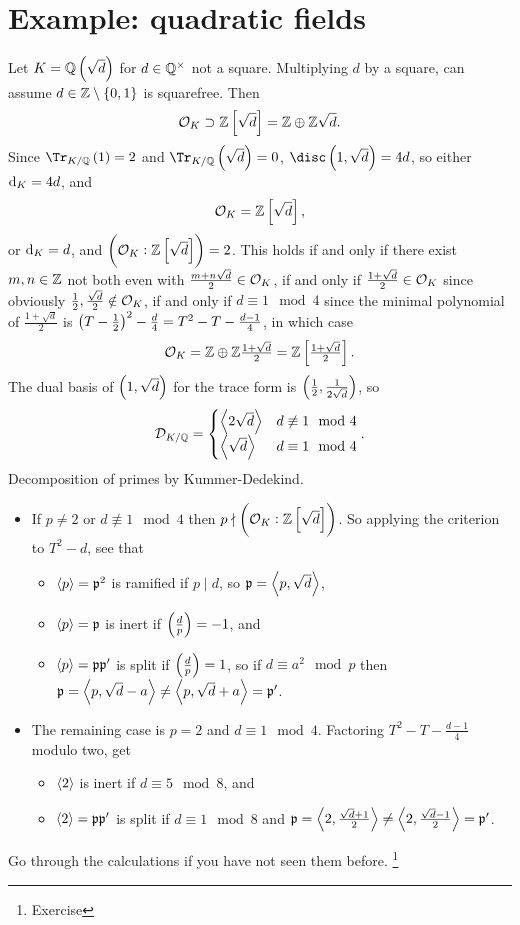 \pagebreak

\section{Example: quadratic fields}


Let $ K = \QQ\br{\sqrt{d}} $ for $ d \in \mathbb{Q}^\times $ not a square. Multiplying $ d $ by a square, can assume $ d \in \ZZ \setminus \cbr{0, 1} $ is squarefree. Then
$$ \OOO_K \supset \ZZ\sbr{\sqrt{d}} = \ZZ \oplus \ZZ\sqrt{d}. $$
Since $ \Tr_{K / \QQ}\br{1} = 2 $ and $ \Tr_{K / \QQ}\br{\sqrt{d}} = 0 $, $ \disc \br{1, \sqrt{d}} = 4d $, so either $ \mathrm{d}_K = 4d $, and
$$ \OOO_K = \ZZ\sbr{\sqrt{d}}, $$
or $ \mathrm{d}_K = d $, and $ \br{\OOO_K : \ZZ\sbr{\sqrt{d}}} = 2 $. This holds if and only if there exist $ m, n \in \mathbb{Z} $ not both even with $ \tfrac{m + n\sqrt{d}}{2} \in \mathcal{O}_K $, if and only if $ \tfrac{1 + \sqrt{d}}{2} \in \mathcal{O}_K $ since obviously $ \tfrac{1}{2}, \tfrac{\sqrt{d}}{2} \notin \mathcal{O}_K $, if and only if $ d \equiv 1 \mod 4 $ since the minimal polynomial of $ \tfrac{1 + \sqrt{d}}{2} $ is $ \br{T - \tfrac{1}{2}}^2 - \tfrac{d}{4} = T^2 - T - \tfrac{d - 1}{4} $, in which case
$$ \OOO_K = \ZZ \oplus \ZZ\tfrac{1 + \sqrt{d}}{2} = \ZZ\sbr{\tfrac{1 + \sqrt{d}}{2}}. $$
The dual basis of $ \br{1, \sqrt{d}} $ for the trace form is $ \br{\tfrac{1}{2}, \tfrac{1}{2\sqrt{d}}} $, so
$$ \mathcal{D}_{K / \mathbb{Q}} =
\begin{cases}
\left\langle 2\sqrt{d} \right\rangle & d \not\equiv 1 \mod 4 \\
\left\langle \sqrt{d} \right\rangle & d \equiv 1 \mod 4
\end{cases}.
$$
Decomposition of primes by Kummer-Dedekind.
\begin{itemize}
\item If $ p \ne 2 $ or $ d \not\equiv 1 \mod 4 $ then $ p \nmid \br{\OOO_K : \ZZ\sbr{\sqrt{d}}} $. So applying the criterion to $ T^2 - d $, see that
\begin{itemize}
\item $ \left\langle p \right\rangle = \mathfrak{p}^2 $ is ramified if $ p \mid d $, so $ \mathfrak{p} = \left\langle p, \sqrt{d} \right\rangle $,
\item $ \left\langle p \right\rangle = \mathfrak{p} $ is inert if $ \br{\tfrac{d}{p}} = -1 $, and
\item $ \left\langle p \right\rangle = \mathfrak{p}\mathfrak{p}' $ is split if $ \br{\tfrac{d}{p}} = 1 $, so if $ d \equiv a^2 \mod p $ then $ \mathfrak{p} = \left\langle p, \sqrt{d} - a \right\rangle \ne \left\langle p, \sqrt{d} + a \right\rangle = \mathfrak{p}' $.
\end{itemize}
\item The remaining case is $ p = 2 $ and $ d \equiv 1 \mod 4 $. Factoring $ T^2 - T - \tfrac{d - 1}{4} $ modulo two, get
\begin{itemize}
\item $ \left\langle 2 \right\rangle $ is inert if $ d \equiv 5 \mod 8 $, and
\item $ \left\langle 2 \right\rangle = \mathfrak{p}\mathfrak{p}' $ is split if $ d \equiv 1 \mod 8 $ and $ \mathfrak{p} = \left\langle 2, \tfrac{\sqrt{d} + 1}{2} \right\rangle \ne \left\langle 2, \tfrac{\sqrt{d} - 1}{2} \right\rangle = \mathfrak{p}' $.
\end{itemize}
\end{itemize}
Go through the calculations if you have not seen them before. \footnote{Exercise}

